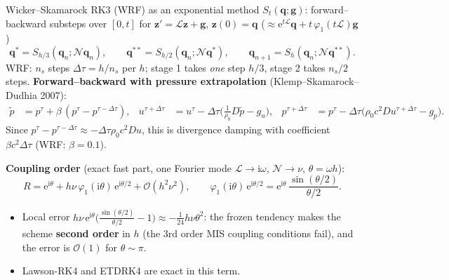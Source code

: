 \documentclass[aspectratio=169,10pt]{beamer}
\newcommand{\ii}{\mathrm{i}}
\newcommand{\ee}{\mathrm{e}}
\newcommand{\bq}{\mathbf{q}}
\newcommand{\LL}{\mathcal{L}}   %
\newcommand{\NN}{\mathcal{N}}   %
\newcommand{\ph}{\varphi}
\begin{document}
\begin{frame}{Wicker--Skamarock RK3 (WRF) as an exponential method}
  \footnotesize
  $S_t(\bq;\mathbf g)$: forward--backward substeps over $[0,t]$ for $\mathbf z'=\LL\mathbf z+\mathbf g$, $\mathbf z(0)=\bq$
  \hfill ($\approx\ee^{t\LL}\bq+t\,\ph_1(t\LL)\mathbf g$)
  \[
    \bq^*=S_{h/3}(\bq_n;\NN\bq_n),\qquad \bq^{**}=S_{h/2}(\bq_n;\NN\bq^*),\qquad \bq_{n+1}=S_h(\bq_n;\NN\bq^{**}).
  \]
  WRF: $n_s$ steps $\Delta\tau=h/n_s$ per $h$; stage 1 takes \emph{one} step $h/3$, stage 2 takes $n_s/2$ steps.
  \textbf{Forward--backward with pressure extrapolation} (Klemp--Skamarock--Dudhia 2007):
  \begin{align*}
    \tilde p &= p^\tau+\beta\,(p^\tau-p^{\tau-\Delta\tau}), &
    u^{\tau+\Delta\tau} &= u^\tau-\Delta\tau\big(\tfrac1{\rho_0}D\tilde p-g_u\big), &
    p^{\tau+\Delta\tau} &= p^\tau-\Delta\tau\big(\rho_0c^2Du^{\tau+\Delta\tau}-g_p\big).
  \end{align*}
  Since $p^\tau-p^{\tau-\Delta\tau}\approx-\Delta\tau\rho_0c^2Du$, this is divergence damping with coefficient $\beta c^2\Delta\tau$ (WRF: $\beta=0.1$).

  \medskip
  \textbf{Coupling order} (exact fast part, one Fourier mode $\LL\to\ii\omega$, $\NN\to\nu$, $\theta=\omega h$):
  \[
    R=\ee^{\ii\theta}+h\nu\,\ph_1(\ii\theta)\,\ee^{\ii\theta/2}+\mathcal O(h^2\nu^2),\qquad
    \ph_1(\ii\theta)\,\ee^{\ii\theta/2}=\ee^{\ii\theta}\,\frac{\sin(\theta/2)}{\theta/2}.
  \]
  \begin{itemize}
    \item Local error $h\nu\,\ee^{\ii\theta}\big(\tfrac{\sin(\theta/2)}{\theta/2}-1\big)\approx-\tfrac{1}{24}h\nu\theta^2$: the frozen
    tendency makes the scheme \textbf{second order} in $h$ (the 3rd order MIS coupling conditions fail), and the error is $\mathcal O(1)$ for $\theta\sim\pi$.
    \item Lawson-RK4 and ETDRK4 are exact in this term.
  \end{itemize}
\end{frame}
\end{document}
